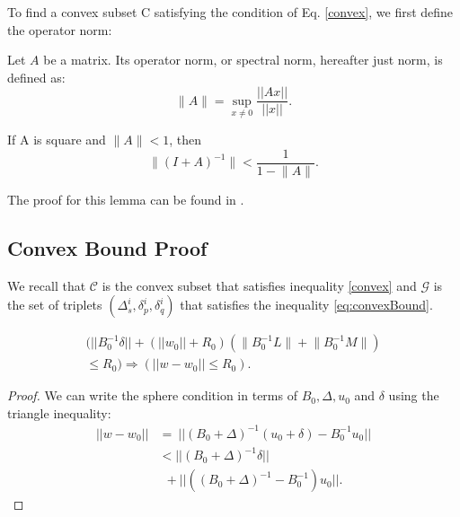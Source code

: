 \documentclass{vldb}
\begin{document}
\begin{appendix}
To find a convex subset C satisfying the condition of Eq. \ref{convex},
we first define the operator norm:
\begin{definition}
Let $A$ be a matrix. Its operator norm, or
spectral norm, hereafter just norm, is defined as:
\begin{equation}
\Big \| A \Big \| = \sup_{x \neq 0}\frac{||Ax||}{||x||}.
\end{equation}
\end{definition}

\begin{lemma} \label{lemma:newman}
If A is square and $\Big \| A \Big \| < 1$, then
\begin{equation*}
\Big \| (I+A)^{-1} \Big \| < \frac{1}{1- \Big \|A \Big \|}.
\end{equation*}
\end{lemma}
The proof for this lemma can be found in \cite{gabel2015monitoring}.

\subsection{Convex Bound Proof}
We recall that $\mathcal{C}$ is the convex subset that satisfies
inequality \ref{convex} and $\mathcal{G}$ is the set of triplets
$(\Delta_s^i, \delta_p^i, \delta_q^i)$
 that satisfies the inequality \ref{eq:convexBound}.

\begin{lemma} \label{GinC}
\begin{equation}
\begin{split}
(||B_0^{-1}\delta|| + (||w_0||+R_0)(\Big \|B_0^{-1}L\Big \|+\Big \|B_0^{-1}M\Big \|) \\
 \leq R_0) \Rightarrow (||w-w_0|| \leq R_0).
\end{split}
\end{equation}
\end{lemma}

\begin{proof}
We can write the sphere condition in terms of $B_0, \Delta, u_0$ and $\delta$ using the triangle
inequality:
\begin{equation} \label{in}
\begin{split}
||w-w_0|| & = \ ||(B_0+\Delta)^{-1}(u_0+\delta) - B_0^{-1}u_0|| \\
& < ||(B_0+\Delta)^{-1}\delta|| \\
& \ \ + ||((B_0+\Delta)^{-1} - B_0^{-1})u_0||.
\end{split}
\end{equation}


\end{proof}
\end{appendix}
\end{document}
